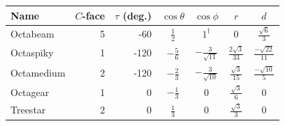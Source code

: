 \begin{center}
\small
\renewcommand{\arraystretch}{1.7}
\begin{tabular}{@{}lrrcccc@{}}
\toprule
Name & $C$-face & $\tau$ (deg.) & $\cos\theta$ & $\cos\phi$ & $r$ & $d$\\
\midrule
Octabeam & 5 & -60 & $\displaystyle \frac{1}{2}$ & $\displaystyle 1^{\dagger}$ & $\displaystyle 0$ & $\displaystyle \frac{\sqrt{6}}{3}$\\
Octaspiky & 1 & -120 & $\displaystyle - \frac{5}{6}$ & $\displaystyle - \frac{3}{\sqrt{11}}$ & $\displaystyle \frac{2 \sqrt{3}}{33}$ & $\displaystyle \frac{- \sqrt{22}}{11}$\\
Octamedium & 2 & -120 & $\displaystyle - \frac{2}{3}$ & $\displaystyle - \frac{3}{\sqrt{10}}$ & $\displaystyle \frac{\sqrt{3}}{15}$ & $\displaystyle \frac{- \sqrt{10}}{5}$\\
Octagear & 1 & 0 & $\displaystyle - \frac{1}{3}$ & $\displaystyle 0$ & $\displaystyle \frac{\sqrt{3}}{6}$ & $\displaystyle 0$\\
Treestar & 2 & 0 & $\displaystyle \frac{1}{3}$ & $\displaystyle 0$ & $\displaystyle \frac{\sqrt{3}}{3}$ & $\displaystyle 0$\\
\bottomrule
\end{tabular}
\end{center}
